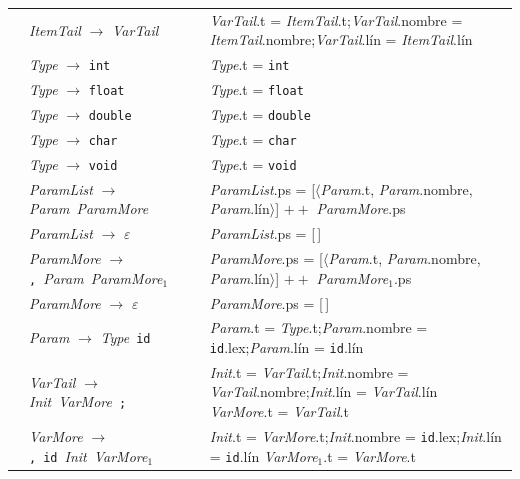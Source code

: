 \documentclass[11pt]{article}
\newcommand{\NT}[1]{\textcolor{ntcolor}{\textit{#1}}}            %
\newcommand{\T}[1]{\textcolor{tcolor}{\texttt{#1}}}              %
\newcommand{\A}[2]{\NT{#1}.\textsf{#2}}                          %
\newcommand{\Ax}[3]{\NT{#1}$_{#2}$.\textsf{#3}}                  %
\newcommand{\ty}[1]{\texttt{#1}}                                 %
\begin{document}
{\begin{longtable}{@{}r@{\hspace{6pt}}>{\raggedright\arraybackslash}p{5.6cm}@{\hspace{8pt}}>{\raggedright\arraybackslash}p{9.9cm}@{}}
\addlinespace[2pt]
{(7)} & \NT{ItemTail} $\rightarrow$ \NT{VarTail} & \A{VarTail}{t} = \A{ItemTail}{t};\quad \A{VarTail}{nombre} = \A{ItemTail}{nombre};\quad \A{VarTail}{lín} = \A{ItemTail}{lín} \\
\addlinespace[2pt]
{(8)} & \NT{Type} $\rightarrow$ \T{int} & \A{Type}{t} = \ty{int} \\
\addlinespace[2pt]
{(9)} & \NT{Type} $\rightarrow$ \T{float} & \A{Type}{t} = \ty{float} \\
\addlinespace[2pt]
{(10)} & \NT{Type} $\rightarrow$ \T{double} & \A{Type}{t} = \ty{double} \\
\addlinespace[2pt]
{(11)} & \NT{Type} $\rightarrow$ \T{char} & \A{Type}{t} = \ty{char} \\
\addlinespace[2pt]
{(12)} & \NT{Type} $\rightarrow$ \T{void} & \A{Type}{t} = \ty{void} \\
\addlinespace[2pt]
{(13)} & \NT{ParamList} $\rightarrow$ \NT{Param}\ \NT{ParamMore} & \A{ParamList}{ps} = [$\langle$\A{Param}{t}, \A{Param}{nombre}, \A{Param}{lín}$\rangle$] $\mathbin{+\!\!+}$ \A{ParamMore}{ps} \\
\addlinespace[2pt]
{(14)} & \NT{ParamList} $\rightarrow$ $\varepsilon$ & \A{ParamList}{ps} = [\,] \\
\addlinespace[2pt]
{(15)} & \NT{ParamMore} $\rightarrow$ \T{,}\ \NT{Param}\ \NT{ParamMore}$_{1}$ & \A{ParamMore}{ps} = [$\langle$\A{Param}{t}, \A{Param}{nombre}, \A{Param}{lín}$\rangle$] $\mathbin{+\!\!+}$ \Ax{ParamMore}{1}{ps} \\
\addlinespace[2pt]
{(16)} & \NT{ParamMore} $\rightarrow$ $\varepsilon$ & \A{ParamMore}{ps} = [\,] \\
\addlinespace[2pt]
{(17)} & \NT{Param} $\rightarrow$ \NT{Type}\ \T{id} & \A{Param}{t} = \A{Type}{t};\quad \A{Param}{nombre} = \T{id}.\textsf{lex};\quad \A{Param}{lín} = \T{id}.\textsf{lín} \\
\addlinespace[2pt]
{(18)} & \NT{VarTail} $\rightarrow$ \NT{Init}\ \NT{VarMore}\ \T{;} & \A{Init}{t} = \A{VarTail}{t};\quad \A{Init}{nombre} = \A{VarTail}{nombre};\quad \A{Init}{lín} = \A{VarTail}{lín} \newline \A{VarMore}{t} = \A{VarTail}{t} \\
\addlinespace[2pt]
{(19)} & \NT{VarMore} $\rightarrow$ \T{,}\ \T{id}\ \NT{Init}\ \NT{VarMore}$_{1}$ & \A{Init}{t} = \A{VarMore}{t};\quad \A{Init}{nombre} = \T{id}.\textsf{lex};\quad \A{Init}{lín} = \T{id}.\textsf{lín} \newline \Ax{VarMore}{1}{t} = \A{VarMore}{t} \\

\end{longtable}}
\end{document}
